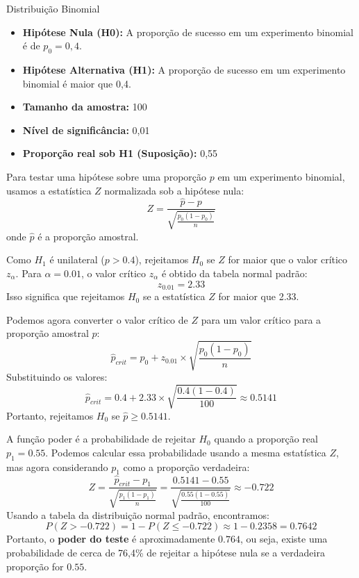 \documentclass[12pt]{beamer}
\begin{document}
\begin{frame}{}
\begin{block}{Distribuição Binomial}
\justifying
\begin{itemize}
\item \textbf{Hipótese Nula (H0):} A proporção de sucesso em um experimento binomial é de $p_{0}=0,4$.
\item \textbf{Hipótese Alternativa (H1):} A proporção de sucesso em um experimento binomial é maior que 0,4.
\item \textbf{Tamanho da amostra:} 100
\item \textbf{Nível de significância:} 0,01
\item \textbf{Proporção real sob H1 (Suposição):} 0,55
\end{itemize}

Para testar uma hipótese sobre uma proporção \( p \) em um experimento binomial, usamos a estatística \( Z \) normalizada sob a hipótese nula:
\[
Z = \frac{\hat{p} - p}{\sqrt{\frac{p_0(1 - p_0)}{n}}}
\]
onde \( \hat{p} \) é a proporção amostral.
\end{block}
\end{frame}

\begin{frame}{}
\begin{block}{}
\justifying
Como \( H_1 \) é unilateral (\( p > 0.4 \)), rejeitamos \( H_0 \) se \( Z \) for maior que o valor crítico \( z_\alpha \). Para \( \alpha = 0.01 \), o valor crítico \( z_\alpha \) é obtido da tabela normal padrão:
\[
z_{0.01} = 2.33
\]
Isso significa que rejeitamos \( H_0 \) se a estatística \( Z \) for maior que 2.33.
\end{block}
\pause
\begin{block}{}
	\justifying
Podemos agora converter o valor crítico de \( Z \) para um valor crítico para a proporção amostral \( \hat{p} \):
\[
\hat{p}_{crit} = p_0 + z_{0.01} \times \sqrt{\frac{p_0(1 - p_0)}{n}}
\]
Substituindo os valores:
\[
\hat{p}_{crit} = 0.4 + 2.33 \times \sqrt{\frac{0.4(1 - 0.4)}{100}}\approx 0.5141
\]
Portanto, rejeitamos \( H_0 \) se \( \hat{p} \geq 0.5141 \).
\end{block}
\end{frame}

\begin{frame}{}
	\begin{block}{}
		\justifying
A função poder é a probabilidade de rejeitar \( H_0 \) quando a proporção real \( p_1 = 0.55 \). Podemos calcular essa probabilidade usando a mesma estatística \( Z \), mas agora considerando \( p_1 \) como a proporção verdadeira:
\[
Z = \frac{\hat{p}_{crit} - p_1}{\sqrt{\frac{p_1(1 - p_1)}{n}}}= \frac{0.5141 - 0.55}{\sqrt{\frac{0.55(1 - 0.55)}{100}}}\approx -0.722
\]
Usando a tabela da distribuição normal padrão, encontramos:
\[
P(Z > -0.722) = 1 - P(Z \leq -0.722) \approx 1 - 0.2358 = 0.7642
\]
Portanto, o \textbf{poder do teste} é aproximadamente \( 0.764 \), ou seja, existe uma probabilidade de cerca de 76,4\% de rejeitar a hipótese nula se a verdadeira proporção for \( 0.55 \).
		
	\end{block}
\end{frame}
\end{document}
